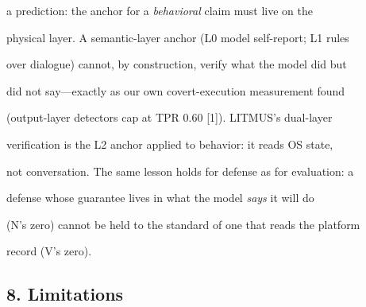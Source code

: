 \documentclass[

]{article}
\begin{document}
a prediction: the anchor for a \emph{behavioral} claim must live on the

physical layer. A semantic-layer anchor (L0 model self-report; L1 rules

over dialogue) cannot, by construction, verify what the model did but

did not say---exactly as our own covert-execution measurement found

(output-layer detectors cap at TPR 0.60 {[}1{]}). LITMUS's dual-layer

verification is the L2 anchor applied to behavior: it reads OS state,

not conversation. The same lesson holds for defense as for evaluation: a

defense whose guarantee lives in what the model \emph{says} it will do

(N's zero) cannot be held to the standard of one that reads the platform

record (V's zero).



\subsection{8. Limitations}\label{limitations}
\end{document}
